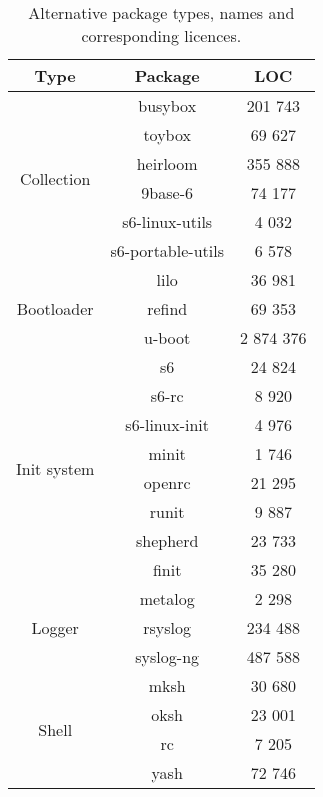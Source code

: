 \begin{table}[!ht]
    \centering
    \begin{tabular}{|c|c|c|}
        \hline
        Type & Package & LOC \\
        \hline
        \hline
        \multirow{6}{*}{Collection} & busybox \cite{busybox} & 201 743 \\
        \cline{2-3}
        & toybox \cite{toybox} & 69 627 \\
        \cline{2-3}
        & heirloom \cite{heirloom} \footnotemark & 355 888 \\
        \cline{2-3}
        & 9base-6 \cite{9base} & 74 177 \\
        \cline{2-3}
        & s6-linux-utils \cite{s6-linux} & 4 032 \\
        \cline{2-3}
        & s6-portable-utils \cite{s6-portable} & 6 578 \\
        \hline
        \hline
        \multirow{3}{*}{Bootloader} & lilo \cite{lilo} & 36 981 \\
        \cline{2-3}
        & refind \cite{refind} & 69 353 \\
        \cline{2-3}
        & u-boot \cite{uboot} & 2 874 376 \\
        \hline
        \hline
        \multirow{8}{*}{Init system} & s6 \cite{s6} & 24 824 \\
        \cline{2-3}
        & s6-rc \cite{s6-rc} & 8 920 \\
        \cline{2-3}
        & s6-linux-init \cite{s6-linux-init} & 4 976 \\
        \cline{2-3}
        & minit \cite{minit} & 1 746 \\
        \cline{2-3}
        & openrc \cite{openrc} & 21 295 \\
        \cline{2-3}
        & runit \cite{runit} & 9 887 \\
        \cline{2-3}
        & shepherd \cite{shepherd} & 23 733 \\
        \cline{2-3}
        & finit \cite{finit} & 35 280 \\
        \hline
        \hline
        \multirow{3}{*}{Logger} & metalog \cite{metalog} & 2 298 \\
        \cline{2-3}
        & rsyslog \cite{rsyslog} & 234 488 \\
        \cline{2-3}
        & syslog-ng \cite{syslog-ng} & 487 588 \\
        \hline
        \hline
        \multirow{4}{*}{Shell} & mksh \cite{mksh} & 30 680 \\
        \cline{2-3}
        & oksh \cite{oksh} & 23 001 \\
        \cline{2-3}
        & rc \cite{rc} & 7 205 \\
        \cline{2-3}
        & yash \cite{yash} & 72 746 \\
        \hline
    \end{tabular}
    \caption{Alternative package types, names and corresponding licences.}
\end{table}


